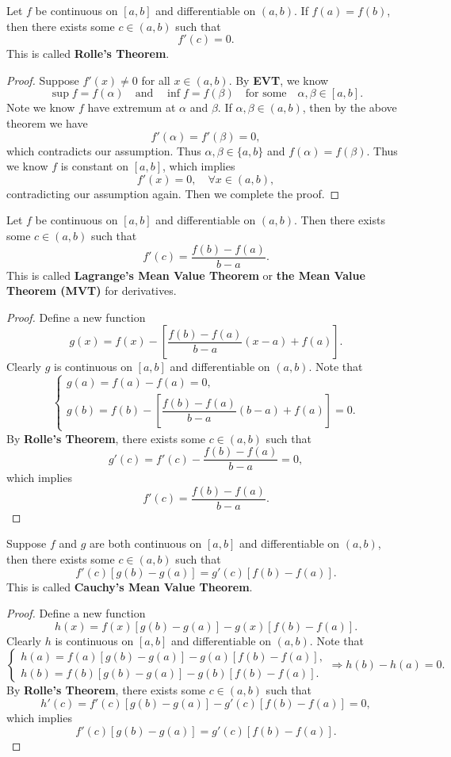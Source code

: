 \documentclass[a4paper]{ctexart}
\begin{document}
	\begin{mythm}
		Let $f$ be continuous on $[a,b]$ and differentiable on $(a,b)$. If $f(a)=f(b)$, then there exists some $c\in (a,b)$ such that
		\[
		f'(c)=0.
		\]
		This is called \textbf{Rolle's Theorem}.
	\end{mythm}
	\begin{proof}
		Suppose $f'(x)\neq 0$ for all $x\in (a,b)$. By \textbf{EVT}, we know
		\[
		\sup f = f(\alpha) \quad \text{and}\quad \inf f = f(\beta)\quad \text{for some}\quad \alpha, \beta \in [a,b].
		\]
		Note we know $f$ have extremum at $\alpha$ and $\beta$. If $\alpha, \beta \in (a,b)$, then by the above theorem we have
		\[
		f'(\alpha)=f'(\beta)=0,
		\]
		which contradicts our assumption. Thus $\alpha,\beta\in \{a,b\}$ and $f(\alpha)=f(\beta)$. Thus we know $f$ is constant on $[a,b]$, which implies
		\[
		f'(x)= 0,\quad \forall x\in (a,b),
		\]
		contradicting our assumption again. Then we complete the proof.
	\end{proof}
	\begin{mythm}
		Let $f$ be continuous on $[a,b]$ and differentiable on $(a,b)$. Then there exists some $c\in (a,b)$ such that
		\[
		f'(c)=\frac{f(b)-f(a)}{b-a}.
		\]
		This is called \textbf{Lagrange's Mean Value Theorem} or \textbf{the Mean Value Theorem (MVT)} for derivatives.
	\end{mythm}
	\begin{proof}
		Define a new function
		\[
		g(x) = f(x) - \left[ \frac{f(b)-f(a)}{b-a} (x - a) + f(a) \right].
		\]
		Clearly $g$ is continuous on $[a,b]$ and differentiable on $(a,b)$. Note that
		\[
		\begin{cases}
			g(a)=f(a)-f(a)=0 ,\\[6pt]
			g(b)=f(b)-\left[ \dfrac{f(b)-f(a)}{b-a} (b - a) + f(a) \right]=0.
		\end{cases}
		\]
		By \textbf{Rolle's Theorem}, there exists some $c\in (a,b)$ such that
		\[
		g'(c) = f'(c) - \frac{f(b)-f(a)}{b-a} = 0,
		\]
		which implies
		\[
		f'(c) = \frac{f(b)-f(a)}{b-a}.
		\]
	\end{proof}
	\begin{mythm}
		Suppose $f$ and $g$ are both continuous on $[a,b]$ and differentiable on $(a,b)$, then there exists some $c\in (a,b)$ such that
		\[
		f'(c)\left[ g(b)-g(a) \right] = g'(c) \left[ f(b)-f(a) \right].
		\]
		This is called \textbf{Cauchy's Mean Value Theorem}.
	\end{mythm}
	\begin{proof}
		Define a new function
		\[
		h(x) = f(x) \left[ g(b)-g(a) \right] - g(x) \left[ f(b)-f(a) \right].
		\]
		Clearly $h$ is continuous on $[a,b]$ and differentiable on $(a,b)$. Note that
		\[
		\begin{cases}
			h(a)=f(a)\left[ g(b)-g(a) \right] - g(a)\left[ f(b)-f(a) \right],\\[6pt]
			h(b)=f(b)\left[ g(b)-g(a) \right] - g(b)\left[ f(b)-f(a) \right].
		\end{cases}
		\Rightarrow h(b)-h(a)=0.
		\]
		By \textbf{Rolle's Theorem}, there exists some $c\in (a,b)$ such that
		\[
		h'(c) = f'(c)\left[ g(b)-g(a) \right] - g'(c)\left[ f(b)-f(a) \right] = 0,
		\]
		which implies
		\[
		f'(c)\left[ g(b)-g(a) \right] = g'(c)\left[ f(b)-f(a) \right].
		\]
	\end{proof}
\end{document}

